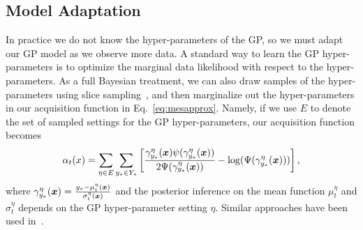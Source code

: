 \subsection{Model Adaptation}
\label{sec:model}

In practice we do not know the hyper-parameters of the GP, so we must adapt our GP model as we observe more data. 
%
A standard way to learn the GP hyper-parameters is to optimize the marginal data likelihood with respect to the hyper-parameters. As a full Bayesian treatment, we can also draw samples of the hyper-parameters using slice sampling~\cite{vanhatalo2013gpstuff}, and then marginalize out the hyper-parameters in our acquisition function in Eq.~\eqref{eq:mesapprox}. Namely, if we use %
$E$ to denote the set of sampled settings for the GP hyper-parameters, our acquisition function becomes
\begin{align*}
\alpha_t(x) = \sum_{\eta\in E}\sum_{y_*\in Y_*}\left[ \frac{\gamma^{\eta}_{y_*}( {\boldsymbol{x}})\psi(\gamma^{\eta}_{y_*}( {\boldsymbol{x}}))}{2\Psi(\gamma^{\eta}_{y_*}({\boldsymbol{x}}))} - \log(\Psi(\gamma^{\eta}_{y_*}( {\boldsymbol{x}})))\right],
\end{align*} %
where $\gamma^{\eta}_{y_*}({\boldsymbol{x}}) = \frac{y_* - \mu^{\eta}_t({\boldsymbol{x}})}{\sigma^{\eta}_t({\boldsymbol{x}})}$ and the posterior inference on the mean function $\mu_t^{\eta}$ and $\sigma_t^{\eta}$  depends on the GP hyper-parameter setting $\eta$. Similar approaches have been used in~\cite{hernandez2014predictive, snoek2012practical}.

